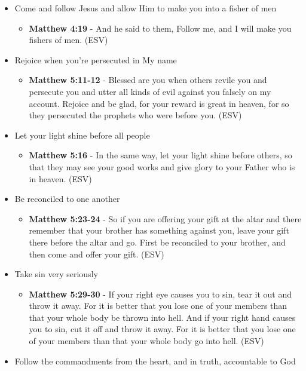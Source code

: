\documentclass[11pt]{article}
\begin{document}
\begin{itemize}
\begin{itemize}
\begin{itemize}
\end{itemize}
\end{itemize}
\item Come and follow Jesus and allow Him to make you into a fisher of men
\begin{itemize}
\item \textbf{Matthew 4:19} - And he said to them, Follow me, and I will make you fishers of men. (ESV)
\end{itemize}
\item Rejoice when you're persecuted in My name
\begin{itemize}
\item \textbf{Matthew 5:11-12} - Blessed are you when others revile you and persecute you and utter all kinds of evil against you falsely on my account. Rejoice and be glad, for your reward is great in heaven, for so they persecuted the prophets who were before you. (ESV)
\end{itemize}
\item Let your light shine before all people
\begin{itemize}
\item \textbf{Matthew 5:16} - In the same way, let your light shine before others, so that they may see your good works and give glory to your Father who is in heaven. (ESV)
\end{itemize}
\item Be reconciled to one another
\begin{itemize}
\item \textbf{Matthew 5:23-24} - So if you are offering your gift at the altar and there remember that your brother has something against you, leave your gift there before the altar and go. First be reconciled to your brother, and then come and offer your gift. (ESV)
\end{itemize}
\item Take sin very seriously
\begin{itemize}
\item \textbf{Matthew 5:29-30} - If your right eye causes you to sin, tear it out and throw it away. For it is better that you lose one of your members than that your whole body be thrown into hell. And if your right hand causes you to sin, cut it off and throw it away. For it is better that you lose one of your members than that your whole body go into hell. (ESV)
\end{itemize}
\item Follow the commandments from the heart, and in truth, accountable to God
\begin{itemize}

\end{itemize}
\end{itemize}
\end{document}
